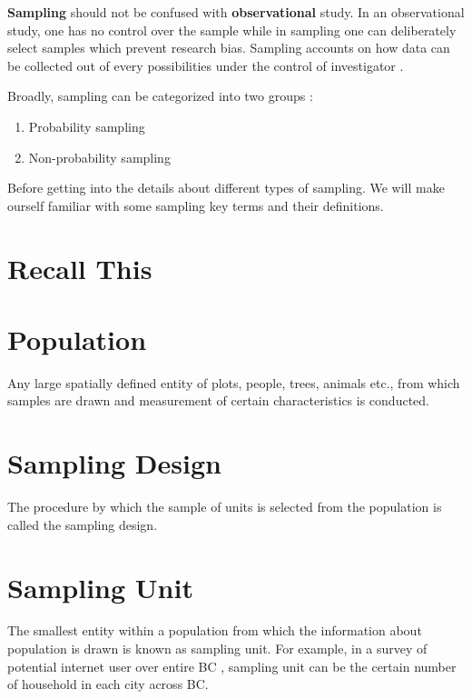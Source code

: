 \documentclass[
]{book}
\providecommand{\tightlist}{%
  \setlength{\itemsep}{0pt}\setlength{\parskip}{0pt}}
\begin{document}
\textbf{Sampling} should not be confused with \textbf{observational} study. In an observational study, one has no control over the sample while in sampling one can deliberately select samples which prevent research bias\citep{thompson2012sampling}. Sampling accounts on how data can be collected out of every possibilities under the control of investigator \citep{thompson2012sampling}.

Broadly, sampling can be categorized into two groups \citep{Teddlie2007}:

\begin{enumerate}
\def\labelenumi{\arabic{enumi}.}
\tightlist
\item
  Probability sampling
\item
  Non-probability sampling
\end{enumerate}

Before getting into the details about different types of sampling. We will make ourself familiar with some sampling key terms and their definitions.

\hypertarget{recall-this-1}{%
\section*{Recall This}\label{recall-this-1}}

\hypertarget{population}{%
\section{Population}\label{population}}

Any large spatially defined entity of plots, people, trees, animals etc., from which samples are drawn and measurement of certain characteristics is conducted.

\hypertarget{sampling-design}{%
\section{Sampling Design}\label{sampling-design}}

The procedure by which the sample of units is selected from the population is called the sampling design.

\hypertarget{sampling-unit}{%
\section{Sampling Unit}\label{sampling-unit}}

The smallest entity within a population from which the information about population is drawn is known as sampling unit. For example, in a survey of potential internet user over entire BC , sampling unit can be the certain number of household in each city across BC.
\end{document}

